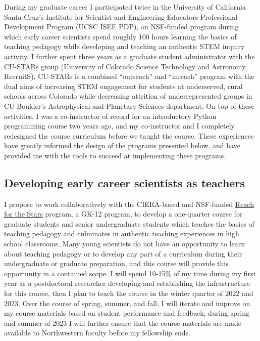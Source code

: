 \documentclass[aasms,11pt]{article}
\begin{document}
During my graduate career I participated twice in the University of California Santa Cruz's Institute for Scientist and Engineering Educators Professional Development Program (UCSC ISEE PDP), an NSF-funded program during which early career scientists spend roughly 100 hours learning the basics of teaching pedagogy while developing and teaching an authentic STEM inquiry activity.
I further spent three years as a graduate student administrator with the CU-STARs group (University of Colorado Science Technology and Astronomy RecruitS).
CU-STARs is a combined ``outreach'' and ``inreach'' program with the dual aims of increasing STEM engagement for students at underserved, rural schools across Colorado while decreasing attrition of underrepresented groups in CU Boulder's Astrophysical and Planetary Sciences department.
On top of these activities, I was a co-instructor of record for an introductory Python programming course two years ago, and my co-instructor and I completely redesigned the course curriculum before we taught the course.
These experiences have greatly informed the design of the programs presented below, and have provided me with the tools to succeed at implementing these programs.

\subsection{Developing early career scientists as teachers}
\label{sct:inquiry_class}
I propose to work collaboratively with the CIERA-based and NSF-funded \href{http://gk12.ciera.northwestern.edu/}{Reach for the Stars} program, a GK-12 program, to develop a one-quarter course for graduate students and senior undergraduate students which teaches the basics of teaching pedagogy and culminates in authentic teaching experiences in high school classrooms.
Many young scientists do not have an opportunity to learn about teaching pedagogy or to develop any part of a curriculum during their undergraduate or graduate preparation, and this course will provide this opportunity in a contained scope.
I will spend 10-15\% of my time during my first year as a postdoctoral researcher developing and establishing the infrastructure for this course, then I plan to teach the course in the winter quarter of 2022 and 2023.
Over the course of spring, summer, and fall, I will iterate and improve on my course materials based on student performance and feedback; during spring and summer of 2023 I will further ensure that the course materials are made available to Northwestern faculty before my fellowship ends.
\end{document}
